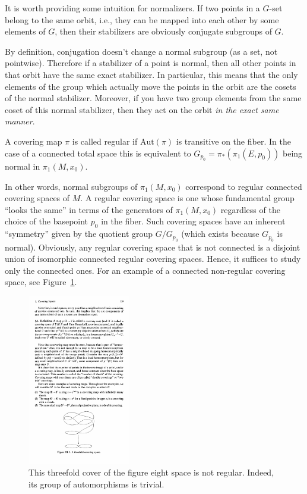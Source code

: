 \begin{rem}
    It is worth providing some intuition for normalizers. If two points in a $G$-set belong to the same orbit, i.e., they can be mapped into each other by some elements of $G$, then their stabilizers are obviously conjugate subgroups of $G$.

    By definition, conjugation doesn't change a normal subgroup (as a set, not pointwise). Therefore if a stabilizer of a point is normal, then all other points in that orbit have the same exact stabilizer. In particular, this means that the only elements of the group which actually move the points in the orbit are the cosets of the normal stabilizer. Moreover, if you have two group elements from the same coset of this normal stabilizer, then they act on the orbit \emph{in the exact same manner}.
\end{rem}

\begin{defn}
    A covering map $\pi$ is called regular if $\mathrm{Aut}(\pi)$ is transitive on the fiber. In the case of a connected total space this is equivalent to $G_{p_0}=\pi_\ast(\pi_1(E,p_0))$ being normal in $\pi_1(M,x_0)$.
\end{defn}

In other words, normal subgroups of $\pi_1(M,x_0)$ correspond to regular connected covering spaces of $M$. A regular covering space is one whose fundamental group ``looks the same'' in terms of the generators of $\pi_1(M,x_0)$ regardless of the choice of the basepoint $p_0$ in the fiber. Such covering spaces have an inherent ``symmetry'' given by the quotient group $G/G_{p_0}$ (which exists because $G_{p_0}$ is normal). Obviously, any regular covering space that is not connected is a disjoint union of isomorphic connected regular covering spaces. Hence, it suffices to study only the connected ones. For an example of a connected non-regular covering space, see Figure~\ref{fig:threefold-cover}.

\begin{figure}[tp]
    \centering
    \includegraphics[width=0.4\textwidth]{figures/threefold_cover.pdf}
    \caption{This threefold cover of the figure eight space is not regular. Indeed, its group of automorphisms is trivial.}
    \label{fig:threefold-cover}
\end{figure}

